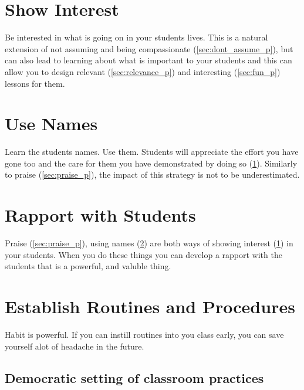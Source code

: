 \documentclass[12pt]{report}
\begin{document}
\section{Show Interest}
\label{sec:show_interest_p}

Be interested in what is going on in your students lives. This is a natural extension of not assuming and being compassionate (\ref{sec:dont_assume_p}), but can also lead to learning about what is important to your students and this can allow you to design relevant (\ref{sec:relevance_p}) and interesting (\ref{sec:fun_p}) lessons for them.



\section{Use Names}
\label{sec:use_names_p}

Learn the students names. Use them. Students will appreciate the effort you have gone too and the care for them you have demonstrated by doing so (\ref{sec:show_interest_p}). Similarly to praise (\ref{sec:praise_p}), the impact of this strategy is not to be underestimated.



\section{Rapport with Students}
\label{sec:rapport_p}

Praise (\ref{sec:praise_p}), using names (\ref{sec:use_names_p}) are both ways of showing interest (\ref{sec:show_interest_p}) in your students. When you do these things you can develop a rapport with the students that is a powerful, and valuble thing.



\section{Establish Routines and Procedures}
\label{sec:routines_p}

Habit is powerful. If you can instill routines into you class early, you can save yourself alot of headache in the future.

\subsection{Democratic setting of classroom practices}
\label{sec:democratic_setting_of_routines_p}
\end{document}
